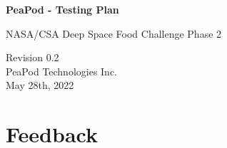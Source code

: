 \documentclass{../tex/report}
\begin{document}
\begin{titlepage}
    \begin{center}
        \vspace*{1.2cm}

        \textbf{\large{PeaPod - Testing Plan}}

        \vspace{0.5cm}

        NASA/CSA Deep Space Food Challenge Phase 2

        \vfill
        
        \vspace{.75cm}

        Revision 0.2\\
        PeaPod Technologies Inc.\\
        May 28th, 2022

    \end{center}
\end{titlepage}

\thispagestyle{plain}

\tableofcontents
\clearpage



\clearpage



\clearpage

\section{Feedback}


\clearpage



\end{document}

